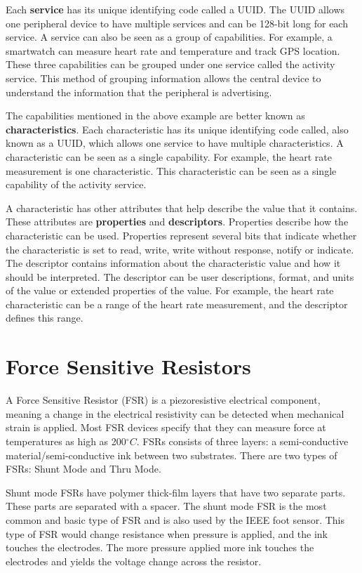 Each \textbf{service} has its unique identifying code called a UUID. The UUID allows one peripheral device to have multiple services and can be 128-bit long for each service. A service can also be seen as a group of capabilities. For example, a smartwatch can measure heart rate and temperature and track GPS location. These three capabilities can be grouped under one service called the activity service. This method of grouping information allows the central device to understand the information that the peripheral is advertising.

The capabilities mentioned in the above example are better known as \textbf{characteristics}. Each characteristic has its unique identifying code called, also known as a UUID, which allows one service to have multiple characteristics. A characteristic can be seen as a single capability. For example, the heart rate measurement is one characteristic. This characteristic can be seen as a single capability of the activity service. 

A characteristic has other attributes that help describe the value that it contains. These attributes are \textbf{properties} and \textbf{descriptors}. Properties describe how the characteristic can be used. Properties represent several bits that indicate whether the characteristic is set to read, write, write without response, notify or indicate. The descriptor contains information about the characteristic value and how it should be interpreted. The descriptor can be user descriptions, format, and units of the value or extended properties of the value\cite{mohammadafaneh2017}. For example, the heart rate characteristic can be a range of the heart rate measurement, and the descriptor defines this range.


\section{Force Sensitive Resistors}
A Force Sensitive Resistor (FSR) is a piezoresistive electrical component, meaning a change in the electrical resistivity can be detected when mechanical strain is applied. Most FSR devices specify that they can measure force at temperatures as high as 200$^\circ C$. FSRs consists of three layers: a semi-conductive material/semi-conductive ink between two substrates. There are two types of FSRs: Shunt Mode and Thru Mode.

Shunt mode FSRs have polymer thick-film layers that have two separate parts. These parts are separated with a spacer. The shunt mode FSR is the most common and basic type of FSR and is also used by the IEEE foot sensor. This type of FSR would change resistance when pressure is applied, and the ink touches the electrodes. The more pressure applied more ink touches the electrodes and yields the voltage change across the resistor.

